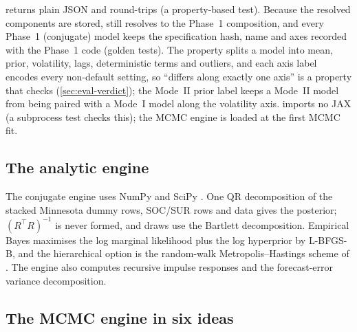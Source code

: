 returns plain JSON and  round-trips (a property-based
test). %
Because the resolved components are stored,  still resolves to the Phase~1 composition,
and every Phase~1 (conjugate) model keeps the specification hash, name and axes recorded with the
Phase~1 code (golden tests). %
The property  splits a model into mean, prior, volatility, lags, deterministic terms and
outliers, and each axis label encodes every non-default setting, so ``differs along exactly one
axis'' is a property that  checks (\cref{sec:eval-verdict}); the Mode~II prior label
 keeps a Mode~II model from being paired with a Mode~I model along the
volatility axis. %
 imports no JAX (a subprocess test checks this); the MCMC engine is loaded at
the first MCMC fit. %

\subsection{The analytic engine}\label{sec:arch-analytic}

The conjugate engine uses NumPy \citep{harris2020array} and SciPy \citep{virtanen2020scipy}.
One QR decomposition of the stacked Minnesota dummy rows, SOC/SUR rows and data gives the posterior;
$(R^\top R)^{-1}$ is never formed, and draws use the Bartlett decomposition.
Empirical Bayes maximises the log marginal likelihood plus the log hyperprior by L-BFGS-B, and the
hierarchical option is the random-walk Metropolis--Hastings scheme of \citet{giannone2015prior}. %
The engine also computes recursive impulse responses and the forecast-error variance decomposition.

\subsection{The MCMC engine in six ideas}\label{sec:arch-mcmc}

